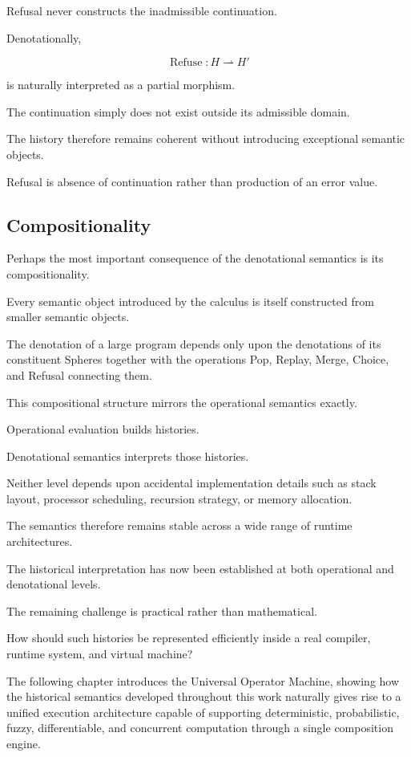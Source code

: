 \documentclass[12pt,oneside]{article}
\theoremstyle{definition}
\theoremstyle{remark}
\begin{document}
Refusal never constructs the inadmissible continuation.

Denotationally,

\[
\operatorname{Refuse}
:
H
\rightharpoonup
H'
\]

is naturally interpreted as a partial morphism.

The continuation simply does not exist outside its admissible domain.

The history therefore remains coherent without introducing exceptional
semantic objects.

Refusal is absence of continuation rather than production of an error value.

\subsection{Compositionality}

Perhaps the most important consequence of the denotational semantics is its
compositionality.

Every semantic object introduced by the calculus is itself constructed from
smaller semantic objects.

The denotation of a large program depends only upon the denotations of its
constituent Spheres together with the operations Pop, Replay, Merge, Choice,
and Refusal connecting them.

This compositional structure mirrors the operational semantics exactly.

Operational evaluation builds histories.

Denotational semantics interprets those histories.

Neither level depends upon accidental implementation details such as stack
layout, processor scheduling, recursion strategy, or memory allocation.

The semantics therefore remains stable across a wide range of runtime
architectures.

The historical interpretation has now been established at both operational and
denotational levels.

The remaining challenge is practical rather than mathematical.

How should such histories be represented efficiently inside a real compiler,
runtime system, and virtual machine?

The following chapter introduces the Universal Operator Machine, showing how
the historical semantics developed throughout this work naturally gives rise
to a unified execution architecture capable of supporting deterministic,
probabilistic, fuzzy, differentiable, and concurrent computation through a
single composition engine.
\end{document}
